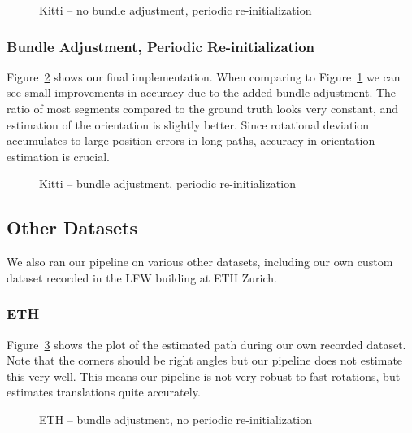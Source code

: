 \documentclass[11pt]{article}
\newlength\figureheight
\newlength\figurewidth
\begin{document}
\begin{figure}[!htb]
	\centering
	\setlength\figureheight{7.5cm} 
	\setlength\figurewidth{11cm}
	
	\caption{Kitti -- no bundle adjustment, periodic re-initialization}
	\label{fig:Kitti_entire_no_BA_reinit_thin}
\end{figure}

\subsubsection{Bundle Adjustment, Periodic Re-initialization}
Figure~\ref{fig:Kitti_entire_BA_reinit_thin} shows our final implementation. When comparing to Figure~\ref{fig:Kitti_entire_no_BA_reinit_thin} we can see small improvements in accuracy due to the added bundle adjustment. The ratio of most segments compared to the ground truth looks very constant, and estimation of the orientation is slightly better. Since rotational deviation accumulates to large position errors in long paths, accuracy in orientation estimation is crucial.

\begin{figure}[!htb]
	\centering
	\setlength\figureheight{7.5cm} 
	\setlength\figurewidth{11cm}
	
	\caption{Kitti -- bundle adjustment, periodic re-initialization}
	\label{fig:Kitti_entire_BA_reinit_thin}
\end{figure}

\subsection{Other Datasets}
We also ran our pipeline on various other datasets, including our own custom dataset recorded in the LFW building at ETH Zurich.

\subsubsection{ETH}
Figure~\ref{fig:ETH_BA_no_reinit} shows the plot of the estimated path during our own recorded dataset. Note that the corners should be right angles but our pipeline does not estimate this very well. This means our pipeline is not very robust to fast rotations, but estimates translations quite accurately.

\begin{figure}[!htb]
	\centering
	\setlength\figureheight{7cm} 
	\setlength\figurewidth{9cm}
	
	\caption{ETH -- bundle adjustment, no periodic re-initialization}
	\label{fig:ETH_BA_no_reinit}
\end{figure}
\end{document}

